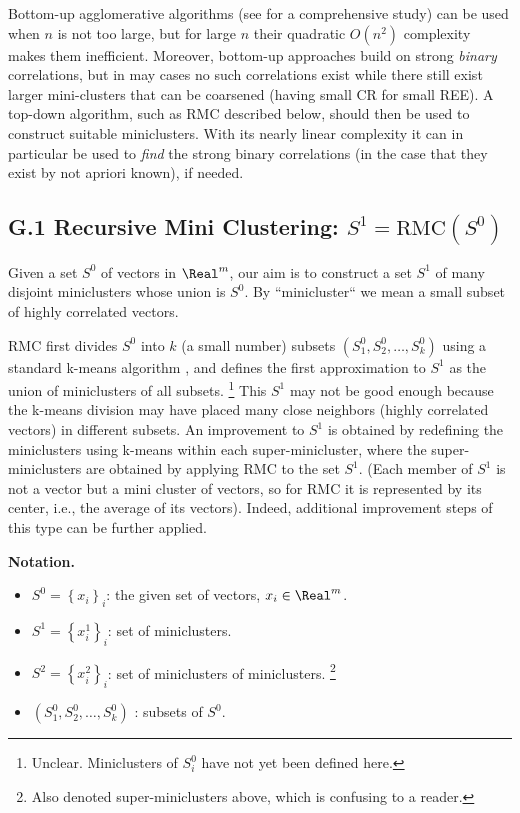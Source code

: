 \documentclass{article} %
\begin{document}
Bottom-up agglomerative algorithms (see \cite{17} for a comprehensive study) can be used when $n$ is not too large, but for large $n$ their quadratic $O(n^2)$ complexity makes them inefficient. Moreover, bottom-up approaches build on strong {\it binary} correlations, but in may cases no such correlations exist while there still exist larger mini-clusters that can be coarsened (having small CR for small REE). A top-down algorithm, such as RMC described below, should then be used to construct suitable miniclusters. With its nearly linear complexity it can in particular be used to {\it find} the strong binary correlations (in the case that they exist by not apriori known), if needed.

\subsection{G.1 Recursive Mini Clustering: $S^1 = \text{RMC}(S^0)$}
Given a set $S^0$ of vectors in $\Real^m$, our aim is to construct a set $S^1$ of many disjoint miniclusters whose union is $S^0$. By ``minicluster`` we mean a small subset of highly correlated vectors.

RMC first divides $S^0$ into $k$ (a small number) subsets $(S^0_1,S^0_2,\dots,S^0_k)$ using a standard k-means algorithm \cite{kmeans}, and defines the first approximation to $S^1$ as the union of miniclusters of all subsets. \footnote{Unclear. Miniclusters of $S^0_i$ have not yet been defined here.} This $S^1$ may not be good enough because the k-means division may have placed many close neighbors (highly correlated vectors) in different subsets. An improvement to $S^1$ is obtained by redefining the miniclusters using k-means within each super-minicluster, where the super-miniclusters are obtained by applying RMC to the set $S^1$. (Each member of $S^1$ is not a vector but a mini cluster of vectors, so for RMC it is represented by its center, i.e., the average of its vectors). Indeed, additional improvement steps of this type can be further applied.

{\bf Notation.}
\begin{itemize}
    \item $S^0 = \left\{x_i\right\}_i$: the given set of vectors, $x_i \in \Real^m$.
    \item $S^1 = \left\{x_i^1\right\}_i$: set of miniclusters.
    \item $S^2 = \left\{x_i^2\right\}_i$: set of miniclusters of miniclusters. \footnote{Also denoted super-miniclusters above, which is confusing to a reader.}
    \item $(S^0_1,S^0_2,\dots,S^0_k)$ : subsets of $S^0$.
\end{itemize}
\end{document}
